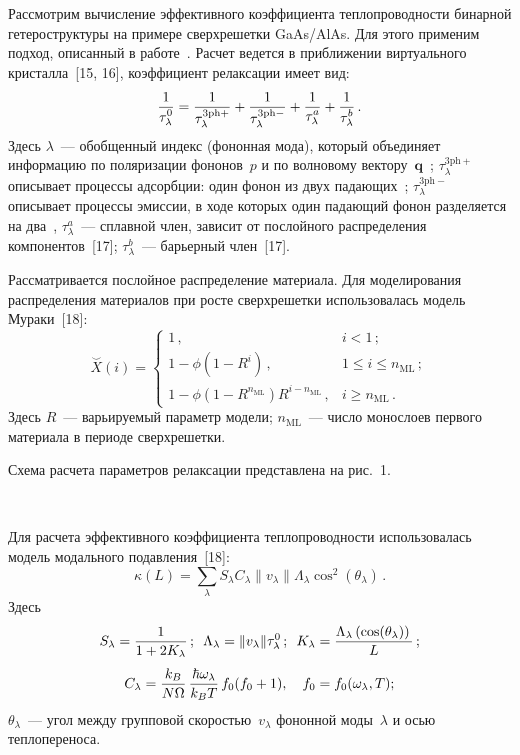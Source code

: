 \begin{multicols}{2}
    Рассмотрим вычисление эффективного коэффициента теплопроводности 
бинарной гетероструктуры на примере сверхрешетки GaAs/AlAs. Для этого 
применим подход, описанный в работе~\cite{8-ab}. Расчет ведется в 
приближении виртуального кристалла~[15, 16], коэффициент релаксации
имеет вид: 
    $$
    \displaystyle\frac{\displaystyle 1\mathstrut}{\displaystyle \tau^0_\lambda\mathstrut}=\displaystyle\frac{\displaystyle 1\mathstrut}{\displaystyle \tau_\lambda^{3\mathrm{ph}+}\mathstrut}+\displaystyle\frac{\displaystyle 1\mathstrut}{\displaystyle \tau_\lambda^{3\mathrm{ph}-}\mathstrut}+\displaystyle\frac{\displaystyle 1\mathstrut}{\displaystyle \tau^a_\lambda\mathstrut} +\displaystyle\frac{\displaystyle 1\mathstrut}{\displaystyle \tau^b_\lambda\mathstrut}\,.
    $$
    Здесь $\lambda$~--- обобщенный индекс (фононная мода), который 
объединяет информацию по поляризации фононов~$p$ и по волновому 
вектору~$\mathbf{q}$~\cite{16-ab}; $\tau_\lambda^{3\mathrm{ph}+}$ описывает процессы 
адсорбции: один фонон из двух падающих~\cite{15-ab, 16-ab}; 
$\tau_\lambda^{3\mathrm{ph}-}$ описывает процессы эмиссии, в ходе которых один 
падающий фонон разделяется на два~\cite{15-ab, 16-ab}, $\tau_\lambda^a$~--- 
сплавной член, зависит от послойного распределения компонентов~[17]; 
$\tau_\lambda^b$~--- барьерный член~[17].
    
    Рассматривается послойное распределение материала. Для моделирования 
распределения материалов при росте сверхрешетки использовалась модель 
Мураки~[18]:
    $$
    \overset{\smile}{X}(i)=\begin{cases}
    1\,, & i<1\,;\\
    1-\phi\left( 1-R^i\right)\,, & 1\leq i\leq n_{\mathrm{ML}}\,;\\
    1-\phi\left(1-R^{n_{\mathrm{ML}}}\right)R^{i-n_{\mathrm{ML}}}\,,& i\geq n_{\mathrm{ML}}\,.
    \end{cases}
    $$
    Здесь $R$~--- варьируемый параметр модели; $n_{\mathrm{ML}}$~--- число монослоев 
первого материала в периоде сверхрешетки.
    
    Схема расчета параметров релаксации пред\-став\-ле\-на на рис.~1.
    
     \begin{figure*} %
     \vspace*{1pt}
    \begin{center}  
  \mbox{%
 \epsfxsize=144.603mm 
 }
\end{center}
\vspace*{-11pt}
     \end{figure*}
     
    Для расчета эффективного коэффициента теп\-ло\-про\-вод\-ности 
использовалась модель модального подавления~[18]:
    $$
    \kappa(L)=\sum\limits_\lambda S_\lambda C_\lambda \| v_\lambda \| 
\Lambda_\lambda \cos^2\left(\theta_\lambda\right)\,.
    $$
Здесь 
$$
S_\lambda=\displaystyle\frac{\displaystyle 1\mathstrut}{\displaystyle 1+2K_\lambda\mathstrut}\,;\enskip 
\Lambda_\lambda= \| v_\lambda \| \tau^0_\lambda\,;\enskip 
K_\lambda=\displaystyle\frac{\displaystyle  \Lambda_\lambda \left(\cos(\theta_\lambda)\right)\mathstrut}{\displaystyle L\mathstrut}\,;
$$ 
\begin{equation*}
C_\lambda=\fr{k_B}{N\Omega}\,\fr{\hbar \omega_\lambda}{k_BT}\, 
f_0(f_0\hm+1),\quad
f_0\hm=f_0(\omega_\lambda, T);
\end{equation*} 
$\theta_\lambda$~--- угол между групповой скоростью~$v_\lambda$ 
фононной моды~$\lambda$ и осью теплопереноса.
   


\end{multicols}
